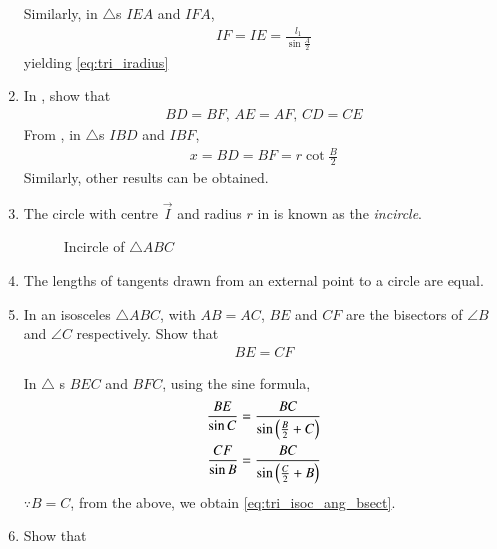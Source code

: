 \begin{enumerate}[label=\thesubsection.\arabic*.,ref=\thesubsection.\theenumi]
		Similarly, 
in $\triangle$s $IEA$ and $IFA$, 
		\begin{align}
IF = IE=  \frac{l_1}{\sin\frac{A}{2}}
		\end{align}
		yielding 
	\eqref{eq:tri_iradius}	
  \item In
	, show that
  \begin{align}
	  BD=BF ,\, 
	  AE=AF ,\, 
	  CD=CE 
  \end{align}
  \solution  From 
, in $\triangle$s $IBD$ and $IBF$, 
		\begin{align}
			x = BD = BF = r \cot \frac{B}{2}
		\end{align}
		Similarly, other results can be obtained.
\item The circle with centre $\vec{I}$ and radius $r$ in  
is known as the {\em incircle}. 
\begin{figure}[!ht]
	\begin{center}
		\resizebox{0.6\columnwidth}{!}{}
	\end{center}
	\caption{Incircle of $\triangle ABC$}
	\label{fig:tri_icircle}	
\end{figure}
\item The lengths of tangents drawn from an external point to a circle are equal.
\item In an isosceles $\triangle ABC$, with $AB = AC$, $BE$ and $CF$ are the bisectors of $\angle B$ and $\angle C$ respectively.   Show that 
\begin{align}
BE = CF
	\label{eq:tri_isoc_ang_bsect}
\end{align}
\begin{figure}[H]
	\centering
		\resizebox{0.6\columnwidth}{!}{}
	\caption{}
	\label{fig:tri_isoc_ang_bsect}
\end{figure}
\solution
%
In $\triangle$ s $BEC$ and $BFC$, using the sine formula, 
\begin{align}
	\label{eq:tri_isoc_ang_bsect-inter}
\begin{split}
	\frac{BE}{\sin C}
	&=\frac{BC}{\sin \left(\frac{B}{2}+C\right)}
	\\
	\frac{CF}{\sin B}
	&=\frac{BC}{\sin \left(\frac{C}{2}+B\right)}
\end{split}
\end{align}
$\because B = C$, from the above, we obtain
	\eqref{eq:tri_isoc_ang_bsect}.
\item Show that
\begin{align}

\end{align}
\end{enumerate}
